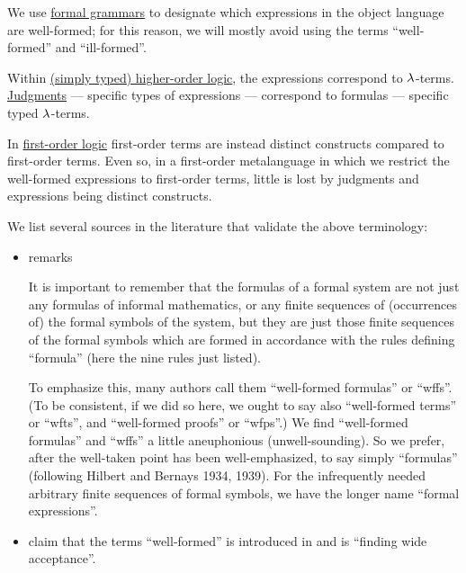 \begin{comments}
  \item We use \hyperref[def:formal_grammar]{formal grammars} to designate which expressions in the object language are well-formed; for this reason, we will mostly avoid using the terms \enquote{well-formed} and \enquote{ill-formed}.

  \item Within \hyperref[def:simply_typed_hol]{(simply typed) higher-order logic}, the expressions correspond to \( \mathrm{\lambda} \)-terms. \hyperref[con:judgment]{Judgments} --- specific types of expressions --- correspond to formulas --- specific typed \( \mathrm{\lambda} \)-terms.

  In \hyperref[def:first_order_syntax]{first-order logic} first-order terms are instead distinct constructs compared to first-order terms. Even so, in a first-order metalanguage in which we restrict the well-formed expressions to first-order terms, little is lost by judgments and expressions being distinct constructs.

  \item We list several sources in the literature that validate the above terminology:
  \begin{itemize}
    \item {} remarks
    \begin{displayquote}
      It is important to remember that the formulas of a formal system are not just any formulas of informal mathematics, or any finite sequences of (occurrences of) the formal symbols of the system, but they are just those finite sequences of the formal symbols which are formed in accordance with the rules defining \enquote{formula} (here the nine rules just listed).

      To emphasize this, many authors call them \enquote{well-formed formulas} or \enquote{wffs}. (To be consistent, if we did so here, we ought to say also \enquote{well-formed terms} or \enquote{wfts}, and \enquote{well-formed proofs} or \enquote{wfps}.) We find \enquote{well-formed formulas} and \enquote{wffs} a little aneuphonious (unwell-sounding). So we prefer, after the well-taken point has been
      well-emphasized, to say simply \enquote{formulas} (following Hilbert and Bernays 1934, 1939). For the infrequently needed arbitrary finite sequences of formal symbols, we have the longer name \enquote{formal expressions}.
    \end{displayquote}

    \item {} claim that the terms \enquote{well-formed} is introduced in  and is \enquote{finding wide acceptance}.


\end{itemize}
\end{comments}
